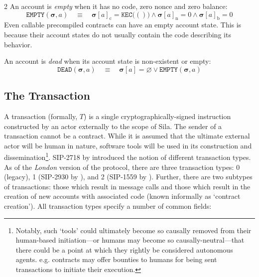 \documentclass[9pt,oneside]{amsart}
\makeatletter
\newcommand*\eg{e.g.\@\xspace}
\makeatother
\begin{document}
\begin{multicols}{2}
An account is \textit{empty} when it has no code, zero nonce and zero balance:
\begin{equation}
\mathtt{EMPTY}(\boldsymbol{\sigma}, a) \quad\equiv\quad \boldsymbol{\sigma}[a]_{\mathrm{c}} = \texttt{KEC}\big(()\big) \wedge \boldsymbol{\sigma}[a]_{\mathrm{n}} = 0 \wedge \boldsymbol{\sigma}[a]_{\mathrm{b}} = 0
\end{equation}
Even callable precompiled contracts can have an empty account state. This is because their account states do not usually contain the code describing its behavior.

An account is \textit{dead} when its account state is non-existent or empty:
\begin{equation}
\mathtt{DEAD}(\boldsymbol{\sigma}, a) \quad\equiv\quad \boldsymbol{\sigma}[a] = \varnothing \vee \mathtt{EMPTY}(\boldsymbol{\sigma}, a)
\end{equation}

\subsection{The Transaction} \label{subsec:transaction}

A transaction (formally, $T$) is a single cryptographically-signed instruction constructed by an actor externally to the scope of Sila.
The sender of a transaction cannot be a contract.
While it is assumed that the ultimate external actor will be human in nature, software tools will be used in its construction and dissemination\footnote{Notably,
such `tools' could ultimately become so causally removed from their human-based initiation---or humans may become so causally-neutral---that there could be a point at which they rightly be considered autonomous agents.
\eg contracts may offer bounties to humans for being sent transactions to initiate their execution.}.
SIP-2718 by \cite{SIP-2718} introduced the notion of different transaction types.
As of the \textit{London} version of the protocol, there are three transaction types: 0 (legacy), 1 (SIP-2930 by \cite{SIP-2930}), and 2 (SIP-1559 by \cite{SIP-1559}).
Further, there are two subtypes of transactions: those which result in message calls and those which result in the creation of new accounts with associated code (known informally as `contract creation').
All transaction types specify a number of common fields:


\end{multicols}
\end{document}
